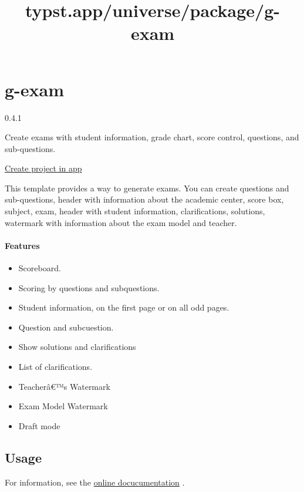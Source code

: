 \title{typst.app/universe/package/g-exam}

\label{banner}
\label{template-thumbnail}

\section{g-exam}\label{g-exam}

{ 0.4.1 }

Create exams with student information, grade chart, score control,
questions, and sub-questions.

\href{/app?template=g-exam&version=0.4.1}{Create project in app}

\label{readme}
This template provides a way to generate exams. You can create questions
and sub-questions, header with information about the academic center,
score box, subject, exam, header with student information,
clarifications, solutions, watermark with information about the exam
model and teacher.

\paragraph{Features}\label{features}

\begin{itemize}
\tightlist
\item
  Scoreboard.
\item
  Scoring by questions and subquestions.
\item
  Student information, on the first page or on all odd pages.
\item
  Question and subcuestion.
\item
  Show solutions and clarifications
\item
  List of clarifications.
\item
  Teacherâ€™s Watermark
\item
  Exam Model Watermark
\item
  Draft mode
\end{itemize}

\subsection{Usage}\label{usage}

For information, see the
\href{https://matheschool.github.io/typst-g-exam/}{online
docucumentation} .

